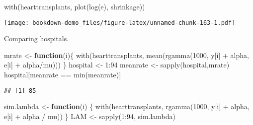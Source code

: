 \documentclass[
]{book}
\newenvironment{Shaded}{\begin{snugshade}}{\end{snugshade}}
\newcommand{\ControlFlowTok}[1]{\textcolor[rgb]{0.13,0.29,0.53}{\textbf{#1}}}
\newcommand{\DecValTok}[1]{\textcolor[rgb]{0.00,0.00,0.81}{#1}}
\newcommand{\FunctionTok}[1]{\textcolor[rgb]{0.00,0.00,0.00}{#1}}
\newcommand{\NormalTok}[1]{#1}
\newcommand{\OtherTok}[1]{\textcolor[rgb]{0.56,0.35,0.01}{#1}}
\newcommand{\SpecialCharTok}[1]{\textcolor[rgb]{0.00,0.00,0.00}{#1}}
\begin{document}
\begin{Shaded}
\begin{Highlighting}[]
\FunctionTok{with}\NormalTok{(hearttransplants,}
     \FunctionTok{plot}\NormalTok{(}\FunctionTok{log}\NormalTok{(e), shrinkage))}
\end{Highlighting}
\end{Shaded}

\texttt{[image: bookdown-demo\_files/figure-latex/unnamed-chunk-163-1.pdf]}

Comparing hospitals.

\begin{Shaded}
\begin{Highlighting}[]
\NormalTok{mrate }\OtherTok{\textless{}{-}} \ControlFlowTok{function}\NormalTok{(i)\{}
   \FunctionTok{with}\NormalTok{(hearttransplants,}
       \FunctionTok{mean}\NormalTok{(}\FunctionTok{rgamma}\NormalTok{(}\DecValTok{1000}\NormalTok{, y[i] }\SpecialCharTok{+}\NormalTok{ alpha, }
\NormalTok{                  e[i] }\SpecialCharTok{+}\NormalTok{ alpha}\SpecialCharTok{/}\NormalTok{mu)))}
\NormalTok{\}}
\NormalTok{hospital }\OtherTok{\textless{}{-}} \DecValTok{1}\SpecialCharTok{:}\DecValTok{94}
\NormalTok{meanrate }\OtherTok{\textless{}{-}} \FunctionTok{sapply}\NormalTok{(hospital,mrate)}
\NormalTok{hospital[meanrate }\SpecialCharTok{==} \FunctionTok{min}\NormalTok{(meanrate)]}
\end{Highlighting}
\end{Shaded}

\begin{verbatim}
## [1] 85
\end{verbatim}

\begin{Shaded}
\begin{Highlighting}[]
\NormalTok{sim.lambda }\OtherTok{\textless{}{-}} \ControlFlowTok{function}\NormalTok{(i) \{}
  \FunctionTok{with}\NormalTok{(hearttransplants,}
       \FunctionTok{rgamma}\NormalTok{(}\DecValTok{1000}\NormalTok{, y[i] }\SpecialCharTok{+}\NormalTok{ alpha, }
\NormalTok{              e[i] }\SpecialCharTok{+}\NormalTok{ alpha }\SpecialCharTok{/}\NormalTok{ mu))}
\NormalTok{\}}
\NormalTok{LAM }\OtherTok{\textless{}{-}} \FunctionTok{sapply}\NormalTok{(}\DecValTok{1}\SpecialCharTok{:}\DecValTok{94}\NormalTok{, sim.lambda)}
\end{Highlighting}
\end{Shaded}
\end{document}
